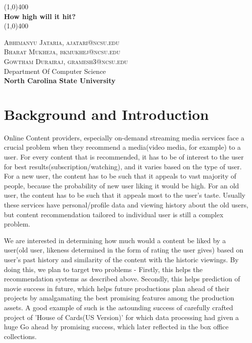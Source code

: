 \documentclass[11pt]{article}
\begin{document}
	\begin{center}
	\line(1,0){400}\\
	[0.2in]
	\huge{\bfseries How high will it hit?}\\
	\line(1,0){400}\\[1cm]
	
	
	
	
	\end{center}
	\begin{center}
	\textsc{Abhimanyu Jataria, ajatari@ncsu.edu\\}
	\textsc{Bharat Mukheja, bkmukhej@ncsu.edu\\}
	\textsc{Gowtham Durairaj, gramesh3@ncsu.edu\\[0.2cm]}
	Department Of Computer Science\\[0.2cm]
	{\bfseries\large North Carolina State University\\[1in]}
	
	\end{center}
\section{Background and Introduction}\label{sec:intro}

	Online Content providers, especially on-demand streaming media services face a crucial problem when they recommend a media(video media, for example) to a user. For every content that is recommended, it has to be of interest to the user for best results(subscription/watching), and it varies based on the type of user. For a new user, the content has to be such that it appeals to vast majority of people, because the probability of new user liking it would be high. For an old user, the content has to be such that it appeals most to the user's taste. Usually these services have personal/profile data and viewing history about the old users, but content recommendation tailored to individual user is still a complex problem. 


	We are interested in determining how much would a content be liked by a user(old user, likeness determined in the form of rating the user gives) based on user's past history and similarity of the content with the historic viewings.	By doing this, we plan to target two problems - Firstly, this helps the recommendation systems as described above. Secondly, this helps prediction of movie success in future, which helps future productions plan ahead of their projects by amalgamating the best promising features among the production assets. A good example of such is the astounding success of carefully crafted project of 'House of Cards(US Version)' for which data processing had given a huge Go ahead by promising success, which later reflected in the box office collections.
\end{document}
